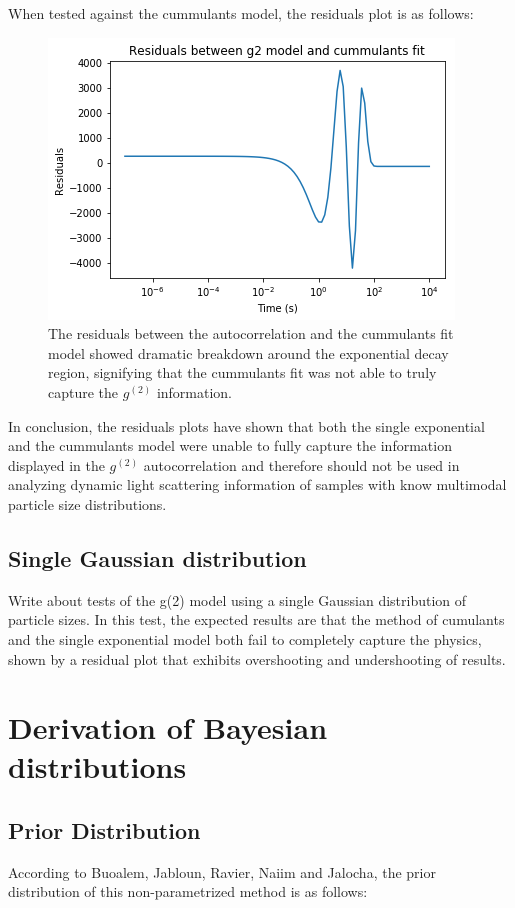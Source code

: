 \documentclass[11pt]{article}
\begin{document}
When tested against the cummulants model, the residuals plot is as follows:

\begin{figure}[h!]
\centering
\includegraphics[width=0.5\linewidth]{cummulants_fit_residuals.png}
\caption{The residuals between the autocorrelation and the cummulants fit model showed dramatic breakdown around the exponential decay region, signifying that the cummulants fit was not able to truly capture the $g^{(2)}$ information.}
\label{fig:cummulants_residuals}
\end{figure}

In conclusion, the residuals plots have shown that both the single exponential and the cummulants model were unable to fully capture the information displayed in the $g^{(2)}$ autocorrelation and therefore should not be used in analyzing dynamic light scattering information of samples with know multimodal particle size distributions. 

\subsection{Single Gaussian distribution}
Write about tests of the g(2) model using a single Gaussian distribution of particle sizes. In this test, the expected results are that the method of cumulants and the single exponential model both fail to completely capture the physics, shown by a residual plot that exhibits overshooting and undershooting of results.

\section{Derivation of Bayesian distributions}
\subsection{Prior Distribution}
According to Buoalem, Jabloun, Ravier, Naiim and Jalocha, the prior distribution of this non-parametrized method is as follows:
\end{document}
